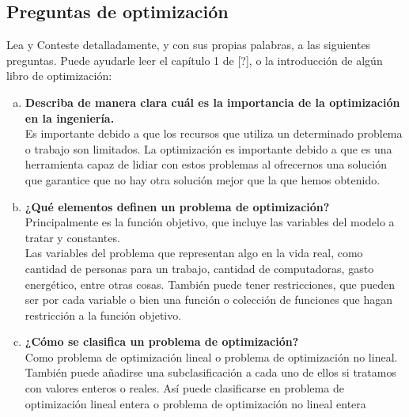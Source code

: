 \documentclass[12pt, letterpaper]{article}
\begin{document}
\subsection{Preguntas de optimizaci\'on}
Lea y Conteste detalladamente, y con sus propias palabras, a las siguientes
preguntas. Puede ayudarle leer el capítulo 1 de [?], o la introducción de
algún libro de optimización:\\
\begin{enumerate}[a)]  
\item \textbf{Describa de manera clara cu\'al es la importancia de la optimizaci\'on en la ingenier\'ia.}\\
Es importante debido a que los recursos que utiliza un determinado problema o trabajo son limitados. La optimización es importante debido a que es una herramienta capaz de lidiar con estos problemas al ofrecernos una solución que garantice que no hay otra solución mejor que la que hemos obtenido.
\item \textbf{¿Qu\'e elementos definen un problema de optimizaci\'on?}\\
Principalmente es la función objetivo, que incluye las variables del modelo a tratar y constantes. \\
Las variables del problema que representan algo en la vida real, como cantidad de personas para un trabajo, cantidad de computadoras, gasto energético, entre otras cosas.
También puede tener restricciones, que pueden ser por cada variable o bien una función o colección de funciones que hagan restricción a la función objetivo.

\item \textbf{¿C\'omo se clasifica un problema de optimizaci\'on?}\\
Como problema de optimización lineal o problema de optimización no lineal. También puede añadirse una subclasificación a cada uno de ellos si tratamos con valores enteros o reales. Así puede clasificarse en problema de optimización lineal entera o problema de optimización no lineal entera
\end{enumerate}
\end{document}
